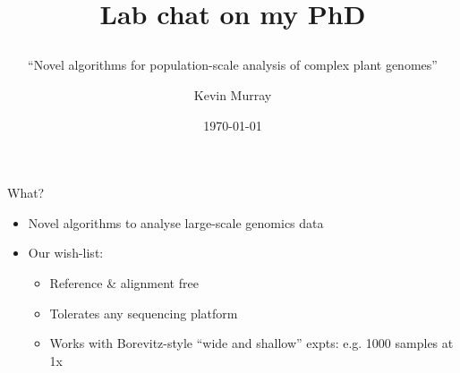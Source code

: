 \documentclass[t]{beamer}
\title{Lab chat on my PhD
  \subtitle{``Novel algorithms for population-scale analysis of complex
              plant genomes''}
\author{Kevin Murray}
\institute{Borevitz Lab, ANU}
\date{\today}
}
\begin{document}
{
\begin{frame}
  \titlepage
  \vfill
\end{frame}
}

\begin{frame}{What?}
  \begin{itemize}
    \item Novel algorithms to analyse large-scale genomics data
  \pause
    \item Our wish-list:
    \begin{itemize}
      \item Reference \& alignment free
      \item Tolerates any sequencing platform
      \item Works with Borevitz-style ``wide and shallow'' expts: e.g. 1000
        samples at 1x
    \end{itemize}
  \end{itemize}
\end{frame}
\end{document}
